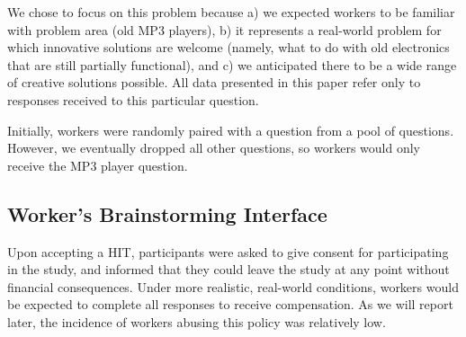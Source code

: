
We chose to focus on this problem because a) we expected workers to be familiar with problem area (old MP3 players), b) it represents a real-world problem for which innovative solutions are welcome (namely, what to do with old electronics that are still partially functional), and c) we anticipated there to be a wide range of creative solutions possible. All data presented in this paper refer only to responses received to this particular question.

Initially, workers were randomly paired with a question from a pool of questions. However, we eventually dropped all other questions, so workers would only receive the MP3 player question. %


\subsection{Worker's Brainstorming Interface}

Upon accepting a HIT, participants were asked to give consent for participating in the study, and informed that they could leave the study at any point without financial consequences. Under more realistic, real-world conditions, workers would be expected to complete all responses to receive compensation. As we will report later, the incidence of workers abusing this policy was relatively low.

